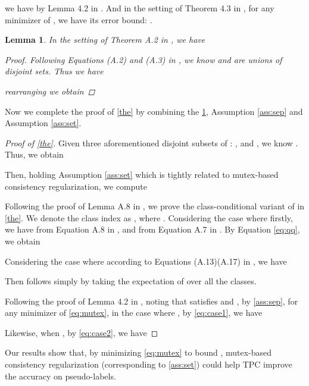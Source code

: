 \documentclass[lettersize,journal]{IEEEtran}
\theoremstyle{plain}
\newtheorem{lemma}[theorem]{Lemma}
\theoremstyle{definition}
\theoremstyle{remark}
\begin{document}
we have  by Lemma 4.2 in \cite{wei2020theoretical}. And in the setting of Theorem 4.3 in \cite{wei2020theoretical}, for any minimizer  of , we have its error bound: . 
\begin{lemma}
\label{lem}
In the setting of Theorem A.2 in \cite{wei2020theoretical}, we have

\begin{proof}
Following Equations (A.2) and (A.3) in \cite{wei2020theoretical}, we know  and  are unions of disjoint sets. Thus we have


rearranging we obtain

\end{proof}
\end{lemma}
Now we complete the proof of \cref{the} by combining the \cref{lem}, Assumption \ref{ass:sep} and Assumption \ref{ass:set}.
\begin{proof}[Proof of \cref{the}]
Given three aforementioned disjoint subsets of  : ,  and , we know .  Thus, we obtain

Then, holding Assumption \ref{ass:set} which is tightly related to mutex-based consistency regularization, we compute


Following the proof of Lemma A.8 in \cite{wei2020theoretical}, we prove the class-conditional variant of  in \cref{the}. We denote the class index as , where .  Considering the case where  firstly, we have  from Equation A.8 in \cite{wei2020theoretical}, and  from Equation A.7 in \cite{wei2020theoretical}. By Equation \eqref{eq:qq}, we obtain

Considering the case where  according to Equations (A.13)(A.17) in \cite{wei2020theoretical}, we have

Then  follows simply by taking the expectation of  over all the classes.

Following the proof of Lemma 4.2 in \cite{wei2020theoretical}, noting that  satisfies  and  ,  by \cref{ass:sep}, for any minimizer  of \cref{eq:mutex}, in the case where , by \cref{eq:case1}, we have

Likewise, when , by \cref{eq:case2}, we have 

\end{proof}
Our results show that, by minimizing \cref{eq:mutex} to bound , mutex-based consistency regularization (corresponding to  \cref{ass:set}) could help TPC improve the accuracy on pseudo-labels.
\end{document}
